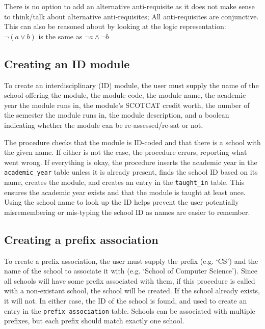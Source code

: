     There is no option to add an alternative anti-requisite as it does not make
    sense to think/talk about alternative anti-requisites; All anti-requisites
    are conjunctive. This can also be reasoned about by looking at the logic
    representation:
    \\
    $\lnot (a \lor b)$ is the same as $\lnot a \land \lnot b$
    
    \subsection{Creating an ID module}
    To create an interdisciplinary (ID) module, the user must supply the name of
    the school offering the module, the module code, the module name, the
    academic year the module runs in, the module's SCOTCAT credit worth, the
    number of the semester the module runs in, the module description, and a
    boolean indicating whether the module can be re-assessed/re-sat or not.
    
    The procedure checks that the module is ID-coded and that there is a school
    with the given name. If either is not the case, the procedure errors,
    reporting what went wrong. If everything is okay, the procedure inserts the
    academic year in the \texttt{academic\_year} table unless it is already
    present, finds the school ID based on its name, creates the module, and
    creates an entry in the \texttt{taught\_in} table. This ensures the
    academic year exists and that the module is taught at least once. Using the
    school name to look up the ID helps prevent the user potentially
    misremembering or mis-typing the school ID as names are easier to remember.
    
    \subsection{Creating a prefix association}
    To create a prefix association, the user must supply the prefix (e.g. `CS')
    and the name of the school to associate it with (e.g. `School of Computer
    Science'). Since all schools will have some prefix associated with them,
    if this procedure is called with a non-existant school, the school will be
    created. If the school already exists, it will not. In either case, the ID
    of the school is found, and used to create an entry in the
    \texttt{prefix\_association} table. Schools can be associated with multiple
    prefixes, but each prefix should match exactly one school.
    
